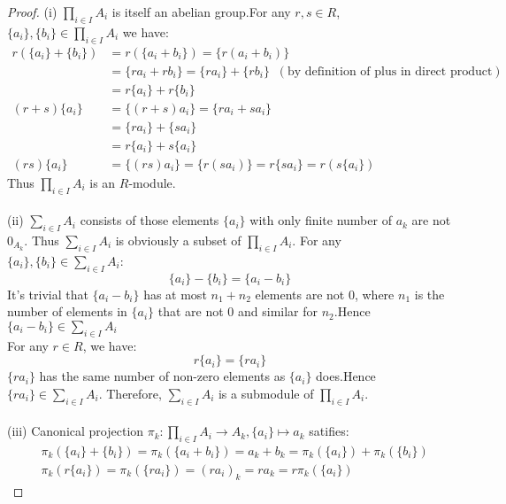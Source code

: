 \documentclass[a4paper]{article}
\begin{document}
    \begin{proof}
        (i) $\prod_{i\in I}A_i$ is itself an abelian group.For any $r,s\in R$, $\{a_i\},\{b_i\}\in \prod_{i\in I}A_i$ we have:
        $$
        \begin{aligned}
            r(\{a_i\}+\{b_i\})&=r(\{a_i+b_i\})=\{r(a_i+b_i)\}\\&=\{ra_i+rb_i\}=\{ra_i\}+\{rb_i\}\;\;(\mbox{by definition of plus in direct product})\\&=r\{a_i\}+r\{b_i\}\\
            (r+s)\{a_i\} &=\{(r+s)a_i\}=\{ra_i+sa_i\}\\&=\{ra_i\}+\{sa_i\}\\&=r\{a_i\}+s\{a_i\}\\
            (rs)\{a_i\}&=\{(rs)a_i\}=\{r(sa_i)\}=r\{sa_i\}=r(s\{a_i\})
        \end{aligned}
        $$
        Thus $\prod_{i \in I} A_i$ is an $R$-module.\\
        \vspace{0.2cm}\\
        (ii) $\sum_{i\in I}A_i$ consists of those elements $\{a_i\}$ with only finite number of $a_k$ are not $0_{A_k}$. Thus $\sum_{i\in I}A_i$ is obviously a subset of $\prod_{i\in I}A_i$.
        For any $\{a_i\},\{b_i\}\in \sum_{i\in I}A_i$:
        $$
        \{a_i\}-\{b_i\}=\{a_i-b_i\}
        $$
        It's trivial that $\{a_i-b_i\}$ has at most $n_1+n_2$ elements are not $0$, where $n_1$ is the number of elements in $\{a_i\}$ that are not $0$ and similar for $n_2$.Hence $\{a_i-b_i\}\in \sum_{i\in I}A_i$ \\
        For any $r\in R$, we have:\\
        $$
        r\{a_i\}=\{ra_i\}
        $$
        $\{ra_i\}$ has the same number of non-zero elements as $\{a_i\}$ does.Hence $\{ra_i\}\in \sum_{i\in I}A_i$. Therefore, $\sum_{i\in I}A_i$ is a submodule of $\prod_{i\in I}A_i$.\\
        \vspace{0.2cm}\\
        (iii) Canonical projection $\pi_k:\prod_{i\in I}A_i\rightarrow A_k,\{a_i\}\mapsto a_k$ satifies:\\
        $$
        \begin{aligned}
        &\pi_k(\{a_i\}+\{b_i\})=\pi_k(\{a_i+b_i\})=a_k+b_k=\pi_k(\{a_i\})+\pi_k(\{b_i\})\\
        &\pi_k(r\{a_i\})=\pi_k(\{ra_i\})=(ra_i)_k=ra_k=r\pi_k(\{a_i\})
        \end{aligned}
$$
\end{proof}
\end{document}
